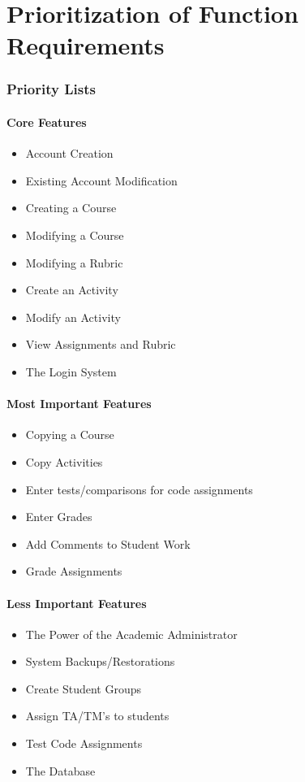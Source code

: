 \documentclass{article}
\begin{document}
\part{Prioritization of Function Requirements}
\section{Priority Lists}
\subsection{Core Features}
\begin{itemize}
  \item Account Creation
  \item Existing Account Modification
  \item Creating a Course
  \item Modifying a Course
  \item Modifying a Rubric
  \item Create an Activity
  \item Modify an Activity
  \item View Assignments and Rubric
  \item The Login System
\end{itemize}

\subsection{Most Important Features}
\begin{itemize}
  \item Copying a Course
  \item Copy Activities
  \item Enter tests/comparisons for code assignments
  \item Enter Grades
  \item Add Comments to Student Work
  \item Grade Assignments
\end{itemize}

\subsection{Less Important Features}
\begin{itemize}
  \item The Power of the Academic Administrator
  \item System Backups/Restorations
  \item Create Student Groups
  \item Assign TA/TM's to students
  \item Test Code Assignments
  \item The Database
\end{itemize}
\end{document}
